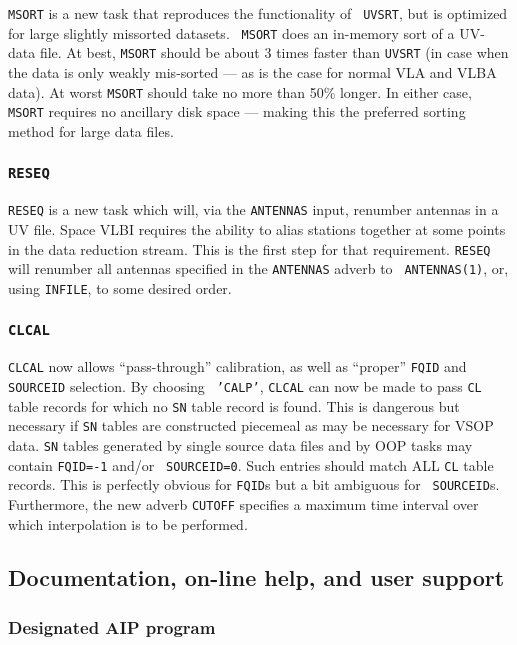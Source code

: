 {\tt MSORT} is a new task that reproduces the functionality of {\tt
UVSRT}, but is optimized for large slightly missorted datasets.  {\tt
MSORT} does an in-memory sort of a UV-data file.  At best, {\tt MSORT}
should be about 3 times faster than {\tt UVSRT} (in case when the data
is only weakly mis-sorted --- as is the case for normal VLA and VLBA
data).  At worst {\tt MSORT} should take no more than 50\% longer.  In
either case, {\tt MSORT} requires no ancillary disk space --- making
this the preferred sorting method for large data files.

\subsubsection{\tt RESEQ}

{\tt RESEQ} is a new task which will, via the {\tt ANTENNAS} input,
renumber antennas in a UV file.  Space VLBI requires the ability to
alias stations together at some points in the data reduction stream.
This is the first step for that requirement.  {\tt RESEQ} will
renumber all antennas specified in the {\tt ANTENNAS} adverb to {\tt
ANTENNAS(1)}, or, using {\tt INFILE}, to some desired order.

\subsubsection{\tt CLCAL}

{\tt CLCAL} now allows ``pass-through'' calibration, as well as
``proper'' {\tt FQID} and {\tt SOURCEID} selection.  By choosing {\tt
'CALP'}, {\tt CLCAL} can now be made to pass {\tt CL} table records
for which no {\tt SN} table record is found.  This is dangerous but
necessary if {\tt SN} tables are constructed piecemeal as may be
necessary for VSOP data.  {\tt SN} tables generated by single source
data files and by OOP tasks may contain {\tt FQID=-1} and/or {\tt
SOURCEID=0}.  Such entries should match ALL {\tt CL} table records.
This is perfectly obvious for {\tt FQID}s but a bit ambiguous for {\tt
SOURCEID}s.  Furthermore, the new adverb {\tt CUTOFF} specifies a
maximum time interval over which interpolation is to be performed.

\subsection{Documentation, on-line help, and user support}

\subsubsection{Designated AIP program}

